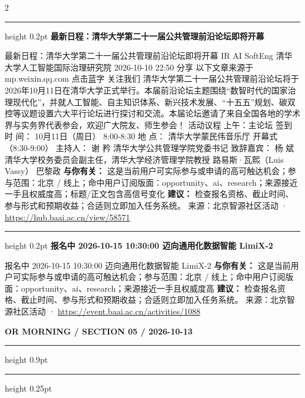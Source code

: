 \documentclass[10.5pt]{ctexart}
\begin{document}
\begin{multicols}{2}
\vspace{2mm}
\hrule height 0.2pt
\vspace{2mm}
{\large\bfseries 最新日程：清华大学第二十一届公共管理前沿论坛即将开幕}\par
最新日程：清华大学第二十一届公共管理前沿论坛即将开幕 IR AI SoftEng 清华大学人工智能国际治理研究院 2026-10-10 22:50 分享 以下文章来源于mp.weixin.qq.com 点击蓝字 关注我们 清华大学第二十一届公共管理前沿论坛将于2026年10月11日在清华大学正式举行。本届前沿论坛主题围绕“数智时代的国家治理现代化”，并就人工智能、自主知识体系、新兴技术发展、“十五五”规划、碳双控等议题设置六大平行论坛进行探讨和交流。本届论坛邀请了来自全国各地的学术界与实务界代表参会，欢迎广大院友、师生参会！ 活动议程 上午：主论坛 签到 时 间： 10月11日（周日） 8:00-8:30 地 点： 清华大学蒙民伟音乐厅 开幕式（8:30-9:00） 主持人： 谢 矜 清华大学公共管理学院党委书记 致辞嘉宾： 杨 斌 清华大学校务委员会副主任，清华大学经济管理学院教授 路易斯·瓦熙（Luis Vassy） 巴黎政
\textbf{与你有关：} 这是当前用户可实际参与或申请的高可触达机会；参与范围：北京 / 线上；命中用户订阅版面：opportunity、ai、research；来源接近一手且权威度高；标题/正文包含高信号变化
\textbf{建议：} 检查报名资格、截止时间、参与形式和预期收益；合适则立即加入任务系统。
{\footnotesize\color{ormuted} 来源：北京智源社区活动 · \url{https://hub.baai.ac.cn/view/58571}}
\vspace{2mm}
\hrule height 0.2pt
\vspace{2mm}
{\large\bfseries 报名中 2026-10-15 10:30:00 迈向通用化数据智能 LimiX-2}\par
报名中 2026-10-15 10:30:00 迈向通用化数据智能 LimiX-2
\textbf{与你有关：} 这是当前用户可实际参与或申请的高可触达机会；参与范围：北京 / 线上；命中用户订阅版面：opportunity、ai、research；来源接近一手且权威度高
\textbf{建议：} 检查报名资格、截止时间、参与形式和预期收益；合适则立即加入任务系统。
{\footnotesize\color{ormuted} 来源：北京智源社区活动 · \url{https://event.baai.ac.cn/activities/1088}}
\end{multicols}
\newpage
{\small\bfseries OR MORNING / SECTION 05 / 2026-10-13}
\vspace{2mm}
\hrule height 0.9pt
\vspace{1.5mm}
\hrule height 0.25pt
\vspace{4mm}
\end{document}
